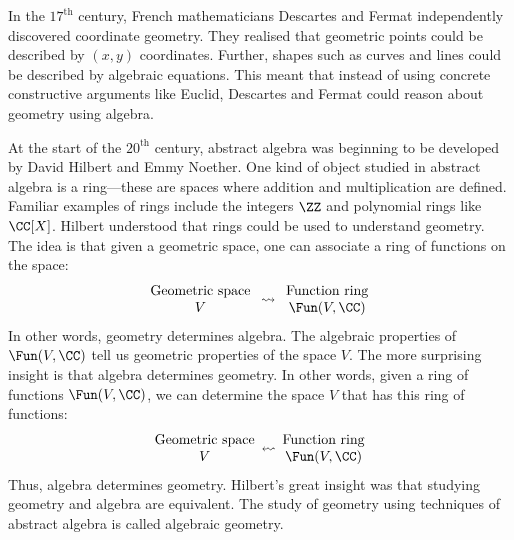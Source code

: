 \documentclass[12pt]{amsart}
\theoremstyle{plain}
\begin{document}
In the $17^\text{th}$ century, French mathematicians Descartes and Fermat independently discovered coordinate geometry.
They realised that geometric points could be described by $(x, y)$ coordinates.
Further, shapes such as curves and lines could be described by algebraic equations.
This meant that instead of using concrete constructive arguments like Euclid, Descartes and Fermat could reason about geometry using algebra.

At the start of the $20^\text{th}$ century, abstract algebra was beginning to be developed by David Hilbert and Emmy Noether.
One kind of object studied in abstract algebra is a ring---these are spaces where addition and multiplication are defined.
Familiar examples of rings include the integers $\ZZ$ and polynomial rings like $\CC[X]$.
Hilbert understood that rings could be used to understand geometry.
The idea is that given a geometric space, one can associate a ring of functions on the space:
\begin{align*}
\begin{array}{c}
	\text{Geometric space} \\
	V
\end{array}
\rightsquigarrow
\begin{array}{c}
	\text{Function ring} \\
	\Fun(V, \CC)
\end{array}
\end{align*}
In other words, geometry determines algebra.
The algebraic properties of $\Fun(V, \CC)$ tell us geometric properties of the space $V$.
The more surprising insight is that algebra determines geometry.
In other words, given a ring of functions $\Fun(V, \CC)$, we can determine the space $V$ that has this ring of functions:
\begin{align*}
\begin{array}{c}
	\text{Geometric space} \\
	 V
\end{array}
\scalebox{-1}[1]{$\rightsquigarrow$}
\begin{array}{c}
	\text{Function ring} \\
	\Fun(V, \CC)
\end{array}
\end{align*}
Thus, algebra determines geometry.
Hilbert's great insight was that studying geometry and algebra are equivalent.
The study of geometry using techniques of abstract algebra is called algebraic geometry.
\end{document}
